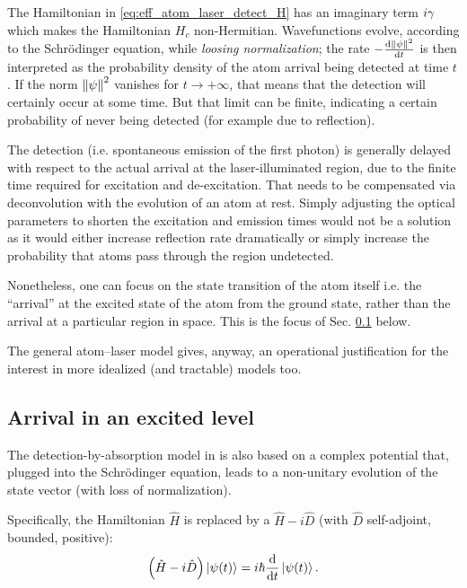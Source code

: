 The Hamiltonian in \eqref{eq:eff_atom_laser_detect_H} has an imaginary term $i\gamma$
which makes the Hamiltonian $H_c$ non-Hermitian. Wavefunctions
evolve, according to the Schr\"odinger equation, while \emph{loosing normalization};
the rate $-\dv{\norm{\psi}^2}{t}$ is then interpreted as the probability density
of the atom arrival being detected at time $t$. If the norm $\norm{\psi}^2$ vanishes for $t\rightarrow+\infty$,
that means that the detection will certainly occur at some time.
But that limit can be finite, indicating a certain probability of never being detected
(for example due to reflection).

The detection (i.e. spontaneous emission of the first photon) is generally delayed
with respect to the actual arrival at the laser-illuminated region, due to the finite time
required for excitation and de-excitation. That needs to be compensated via deconvolution
with the evolution of an atom at rest. Simply adjusting the optical parameters
to shorten the excitation and emission times
would not be a solution as it would either increase reflection rate dramatically
or simply increase the probability that atoms pass through the region undetected.

Nonetheless, one can focus on the state transition of the atom itself i.e.
the ``arrival'' at the excited state of the atom from the ground state,
rather than the arrival at a particular region in space. This is the
focus of Sec. \ref{sec:hist:detect:kiukas} below.

The general atom--laser
model gives, anyway, an operational justification for the interest
in more idealized (and tractable) models too.

\subsection{Arrival in an excited level}\label{sec:hist:detect:kiukas}

The detection-by-absorption model in \cite{RuschhauptAbsorption}
is also based on a complex potential that, plugged into the Schr\"odinger equation,
leads to a non-unitary evolution of the state vector
(with loss of normalization).

Specifically, the Hamiltonian $\hat{H}$ is replaced by a $\hat{H} - i\hat{D}$
(with $\hat{D}$ self-adjoint, bounded, positive):
\begin{equation}\label{eq:schrod_complex_pot}
  \qty(\hat{H}  - i\hat{D})\ket{\psi(t)} = i\hbar\dv{t}\ket{\psi(t)}  \text{.}
\end{equation}

